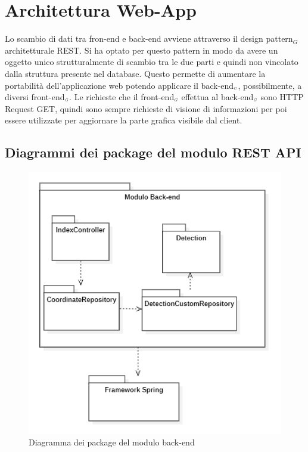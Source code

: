 \section{Architettura Web-App}\label{ArchitetturaDelProdottoWebApp}
Lo scambio di dati tra fron-end e back-end avviene attraverso il design pattern$_G$ architetturale REST. Si ha optato per questo pattern in modo da avere un oggetto unico strutturalmente di scambio tra le due parti e quindi non vincolato  dalla  struttura  presente  nel  database.
Questo permette di aumentare la portabilità dell'applicazione web potendo applicare il back-end$_{\scaleto{G}{3pt}}$, possibilmente, a diversi front-end$_{\scaleto{G}{3pt}}$. Le richieste che il front-end$_{\scaleto{G}{3pt}}$ effettua al back-end$_{\scaleto{G}{3pt}}$ sono HTTP Request GET, quindi sono sempre richieste di visione di informazioni per poi essere utilizzate per aggiornare la parte grafica visibile dal client.
\subsection{Diagrammi dei package del modulo REST API}\label{DiagrammaDeiPackageRestApi}
\begin{center}
	\begin{figure}[H]
		\centering\includegraphics[scale=0.8]{../immagini/diag_PB/diag_pack_spring.png}
		\caption{Diagramma dei package del modulo back-end}
	\end{figure}
\end{center}
